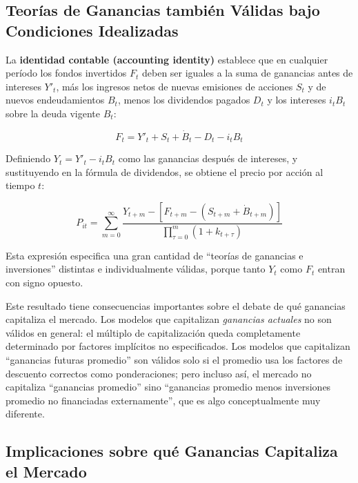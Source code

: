 \documentclass[12pt]{article}
\begin{document}
\subsection{Teor\'ias de Ganancias tambi\'en V\'alidas bajo Condiciones Idealizadas}

La \textbf{identidad contable (accounting identity)} establece que en cualquier per\'iodo los fondos invertidos $F_t$ deben ser iguales a la suma de ganancias antes de intereses $Y'_t$, m\'as los ingresos netos de nuevas emisiones de acciones $S_t$ y de nuevos endeudamientos $B_t$, menos los dividendos pagados $D_t$ y los intereses $i_t B_t$ sobre la deuda vigente $B_t$:

\begin{equation}
F_t = Y'_t + S_t + \dot{B}_t - D_t - i_t B_t
\end{equation}

Definiendo $Y_t = Y'_t - i_t B_t$ como las ganancias despu\'es de intereses, y sustituyendo en la f\'ormula de dividendos, se obtiene el precio por acci\'on al tiempo $t$:

\begin{equation}
P_{it} = \sum_{m=0}^{\infty} \frac{Y_{t+m} - [F_{t+m} - (S_{t+m} + \dot{B}_{t+m})]}{\prod_{\tau=0}^{m}(1 + k_{t+\tau})}
\end{equation}

Esta expresi\'on especifica una gran cantidad de ``teor\'ias de ganancias e inversiones'' distintas e individualmente v\'alidas, porque tanto $Y_t$ como $F_t$ entran con signo opuesto.

\begin{explicacion}
Este resultado tiene consecuencias importantes sobre el debate de qu\'e ganancias capitaliza el mercado. Los modelos que capitalizan \textit{ganancias actuales} no son v\'alidos en general: el m\'ultiplo de capitalizaci\'on queda completamente determinado por factores impl\'icitos no especificados. Los modelos que capitalizan ``ganancias futuras promedio'' son v\'alidos solo si el promedio usa los factores de descuento correctos como ponderaciones; pero incluso as\'i, el mercado no capitaliza ``ganancias promedio'' sino ``ganancias promedio menos inversiones promedio no financiadas externamente'', que es algo conceptualmente muy diferente.
\end{explicacion}

\subsection{Implicaciones sobre qu\'e Ganancias Capitaliza el Mercado}
\end{document}
